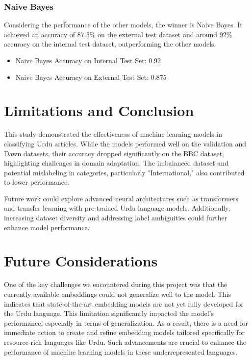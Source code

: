 \documentclass[sigconf]{acmart}
\begin{document}
\subsubsection{Naive Bayes}

Considering the performance of the other models, the winner is Naive Bayes. It achieved an accuracy of 87.5\% on the external test dataset and around 92\% accuracy on the internal test dataset, outperforming the other models.

\begin{itemize}
    \item Naive Bayes Accuracy on Internal Test Set: 0.92
    \item Naive Bayes Accuracy on External Test Set: 0.875
\end{itemize}


\section{Limitations and Conclusion}
This study demonstrated the effectiveness of machine learning models in classifying Urdu articles. While the models performed well on the validation and Dawn datasets, their accuracy dropped significantly on the BBC dataset, highlighting challenges in domain adaptation. The imbalanced dataset and potential mislabeling in categories, particularly "International," also contributed to lower performance.

Future work could explore advanced neural architectures such as transformers and transfer learning with pre-trained Urdu language models. Additionally, increasing dataset diversity and addressing label ambiguities could further enhance model performance.

\section{Future Considerations}

One of the key challenges we encountered during this project was that the currently available embeddings could not generalize well to the model. This indicates that state-of-the-art embedding models are not yet fully developed for the Urdu language. This limitation significantly impacted the model's performance, especially in terms of generalization. As a result, there is a need for immediate action to create and refine embedding models tailored specifically for resource-rich languages like Urdu. Such advancements are crucial to enhance the performance of machine learning models in these underrepresented languages.
\end{document}
